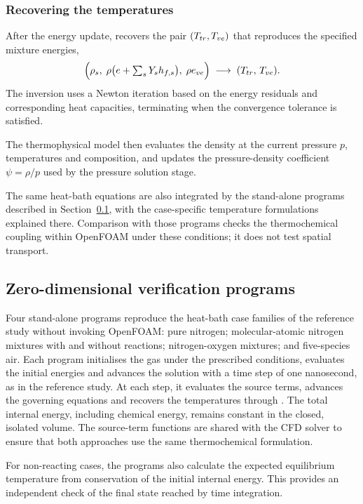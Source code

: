\subsubsection{Recovering the temperatures}
\label{sec:implementato-temperature}

After the energy update, \mpp{} recovers the pair $(T_{tr},T_{ve})$ that
reproduces the specified mixture energies,
\begin{equation}
  \Big(\rho_s,\; \rho\big(e + \textstyle\sum_s Y_s h_{f,s}\big),\; \rho e_{ve}\Big)
  \;\longrightarrow\; (T_{tr},\,T_{ve}) .
\end{equation}
The inversion uses a Newton iteration based on the energy residuals and
corresponding heat capacities, terminating when the convergence tolerance is
satisfied.

The thermophysical model then evaluates the density at the current pressure
$p$, temperatures and composition, and updates the pressure-density
coefficient $\psi=\rho/p$ used by the pressure solution stage.

The same heat-bath equations are also integrated by the stand-alone
programs described in Section~\ref{sec:programmi0D}, with the case-specific
temperature formulations explained there. Comparison with those programs
checks the thermochemical coupling within OpenFOAM under these conditions;
it does not test spatial transport.

\subsection{Zero-dimensional verification programs}
\label{sec:programmi0D}

Four stand-alone programs reproduce the heat-bath case families of the
reference study without invoking OpenFOAM: pure nitrogen; molecular-atomic
nitrogen mixtures with and without reactions; nitrogen-oxygen mixtures; and
five-species air. Each program initialises the gas under the prescribed
conditions, evaluates the initial energies and advances the solution with a
time step of one nanosecond, as in the reference study. At each step, it
evaluates the source terms, advances the governing equations and recovers the
temperatures through \mpp{}. The total
internal energy, including chemical energy, remains constant in the closed,
isolated volume. The source-term functions are shared with the CFD solver to
ensure that both approaches use the same thermochemical formulation.

For non-reacting cases, the programs also calculate the expected equilibrium
temperature from conservation of the initial internal energy. This provides
an independent check of the final state reached by time integration.

